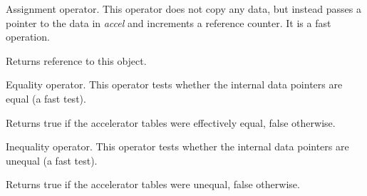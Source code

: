 
Assignment operator. This operator does not copy any data, but instead
passes a pointer to the data in {\it accel} and increments a reference
counter. It is a fast operation.




Returns reference to this object.



Equality operator. This operator tests whether the internal data pointers are
equal (a fast test).




Returns true if the accelerator tables were effectively equal, false otherwise.



Inequality operator. This operator tests whether the internal data pointers are
unequal (a fast test).




Returns true if the accelerator tables were unequal, false otherwise.


